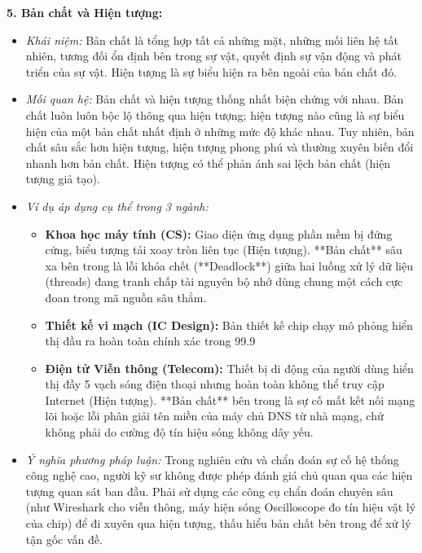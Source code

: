 \documentclass[12pt,a4paper]{article}
\begin{document}
{\noindent
\textbf{5. Bản chất và Hiện tượng:}
\begin{itemize}
    \item \textit{Khái niệm:} Bản chất là tổng hợp tất cả những mặt, những mối liên hệ tất nhiên, tương đối ổn định bên trong sự vật, quyết định sự vận động và phát triển của sự vật. Hiện tượng là sự biểu hiện ra bên ngoài của bản chất đó.
    \item \textit{Mối quan hệ:} Bản chất và hiện tượng thống nhất biện chứng với nhau. Bản chất luôn luôn bộc lộ thông qua hiện tượng; hiện tượng nào cũng là sự biểu hiện của một bản chất nhất định ở những mức độ khác nhau. Tuy nhiên, bản chất sâu sắc hơn hiện tượng, hiện tượng phong phú và thường xuyên biến đổi nhanh hơn bản chất. Hiện tượng có thể phản ánh sai lệch bản chất (hiện tượng giả tạo).
    \item \textit{Ví dụ áp dụng cụ thể trong 3 ngành:}
    \begin{itemize}
        \item \textbf{Khoa học máy tính (CS):} Giao diện ứng dụng phần mềm bị đứng cứng, biểu tượng tải xoay tròn liên tục (Hiện tượng). **Bản chất** sâu xa bên trong là lỗi khóa chết (**Deadlock**) giữa hai luồng xử lý dữ liệu (threads) đang tranh chấp tài nguyên bộ nhớ dùng chung một cách cực đoan trong mã nguồn sâu thẳm.
        \item \textbf{Thiết kế vi mạch (IC Design):} Bản thiết kế chip chạy mô phỏng hiển thị đầu ra hoàn toàn chính xác trong 99.9%
        \item \textbf{Điện tử Viễn thông (Telecom):} Thiết bị di động của người dùng hiển thị đầy 5 vạch sóng điện thoại nhưng hoàn toàn không thể truy cập Internet (Hiện tượng). **Bản chất** bên trong là sự cố mất kết nối mạng lõi hoặc lỗi phân giải tên miền của máy chủ DNS từ nhà mạng, chứ không phải do cường độ tín hiệu sóng không dây yếu.
    \end{itemize}
    \item \textit{Ý nghĩa phương pháp luận:} Trong nghiên cứu và chẩn đoán sự cố hệ thống công nghệ cao, người kỹ sư không được phép đánh giá chủ quan qua các hiện tượng quan sát ban đầu. Phải sử dụng các công cụ chẩn đoán chuyên sâu (như Wireshark cho viễn thông, máy hiện sóng Oscilloscope đo tín hiệu vật lý của chip) để đi xuyên qua hiện tượng, thấu hiểu bản chất bên trong để xử lý tận gốc vấn đề.
\end{itemize}

}
\end{document}
